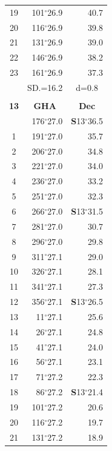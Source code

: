 \documentclass[10pt, a4paper]{report}
\begin{document}
\begin{scriptsize}
\begin{tabular*}{0.2\textwidth}[t]{@{\extracolsep{\fill}}|c|rr|}
19 & 101$^\circ$26.9 & 40.7\\
20 & 116$^\circ$26.9 & 39.8\\
21 & 131$^\circ$26.9 & \raisebox{0.24ex}{\boldmath$\cdot$~\boldmath$\cdot$~~}39.0\\
22 & 146$^\circ$26.9 & 38.2\\
23 & 161$^\circ$26.9 & 37.3\\
\hline
\rule{0pt}{2.4ex} & \multicolumn{1}{c}{SD.=16.2} & \multicolumn{1}{c|}{d=0.8}\\
\hline
\multicolumn{1}{c}{}\\[-0.5ex]\hline
\multicolumn{1}{|c|}{\rule{0pt}{2.6ex}\textbf{13}} & \multicolumn{1}{c}{\textbf{GHA}} & \multicolumn{1}{c|}{\textbf{Dec}}\\
\hline\rule{0pt}{2.6ex}\noindent
0 & 176$^\circ$27.0 & \textbf{S}13$^\circ$36.5\\
1 & 191$^\circ$27.0 & 35.7\\
2 & 206$^\circ$27.0 & 34.8\\
3 & 221$^\circ$27.0 & \raisebox{0.24ex}{\boldmath$\cdot$~\boldmath$\cdot$~~}34.0\\
4 & 236$^\circ$27.0 & 33.2\\
5 & 251$^\circ$27.0 & 32.3\\[2Pt]
6 & 266$^\circ$27.0 & \textbf{S}13$^\circ$31.5\\
7 & 281$^\circ$27.0 & 30.7\\
8 & 296$^\circ$27.0 & 29.8\\
9 & 311$^\circ$27.1 & \raisebox{0.24ex}{\boldmath$\cdot$~\boldmath$\cdot$~~}29.0\\
10 & 326$^\circ$27.1 & 28.1\\
11 & 341$^\circ$27.1 & 27.3\\[2Pt]
12 & 356$^\circ$27.1 & \textbf{S}13$^\circ$26.5\\
13 & 11$^\circ$27.1 & 25.6\\
14 & 26$^\circ$27.1 & 24.8\\
15 & 41$^\circ$27.1 & \raisebox{0.24ex}{\boldmath$\cdot$~\boldmath$\cdot$~~}24.0\\
16 & 56$^\circ$27.1 & 23.1\\
17 & 71$^\circ$27.2 & 22.3\\[2Pt]
18 & 86$^\circ$27.2 & \textbf{S}13$^\circ$21.4\\
19 & 101$^\circ$27.2 & 20.6\\
20 & 116$^\circ$27.2 & 19.7\\
21 & 131$^\circ$27.2 & \raisebox{0.24ex}{\boldmath$\cdot$~\boldmath$\cdot$~~}18.9\\

\end{tabular*}
\end{scriptsize}
\end{document}
